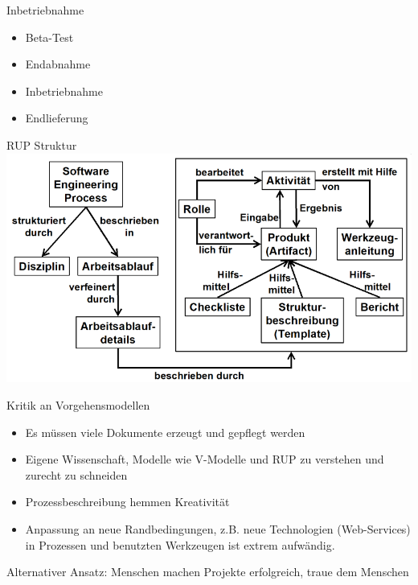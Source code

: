\begin{bonus}{Inbetriebnahme}
    \begin{itemize}
        \item Beta-Test
        \item Endabnahme
        \item Inbetriebnahme
        \item Endlieferung
    \end{itemize}
\end{bonus}

\begin{bonus}{RUP Struktur}
    \includegraphics[width=\textwidth]{includes/figures/RUP_structure.png}
\end{bonus}

\begin{bonus}{Kritik an Vorgehensmodellen}
    \begin{itemize}
        \item Es müssen viele Dokumente erzeugt und gepflegt werden
        \item Eigene Wissenschaft, Modelle wie V-Modelle und RUP zu verstehen und zurecht zu schneiden
        \item Prozessbeschreibung hemmen Kreativität
        \item Anpassung an neue Randbedingungen, z.B. neue Technologien (Web-Services) in Prozessen und benutzten Werkzeugen ist extrem aufwändig.
    \end{itemize}

    Alternativer Ansatz:
    Menschen machen Projekte erfolgreich, traue dem Menschen
\end{bonus}